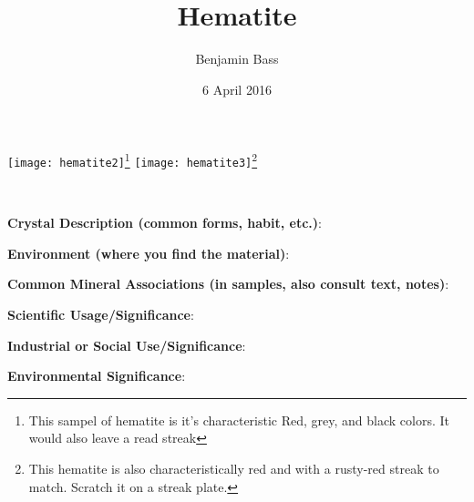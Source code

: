 \documentclass[10pt]{article}
\author{Benjamin Bass}
\date{6 April 2016}
\title{\vspace{-2.0cm}Hematite} %
\begin{document}
\maketitle


\begin{center}
  \texttt{[image: hematite2]}\footnote{This sampel of hematite is it's characteristic Red, grey, and black colors. It would also leave a read streak}
  \texttt{[image: hematite3]}\footnote{This hematite is also characteristically red and with a rusty-red streak to match. Scratch it on a streak plate.}
\end{center}



\
\
\
\
\
\
\
\
\
\

\begin{framed}
  \textbf{Crystal Description (common forms, habit, etc.)}: 
\end{framed}

\begin{framed}
  \textbf{Environment (where you find the material)}: 
\end{framed}

\begin{framed}
  \textbf{Common Mineral Associations (in samples, also consult text, notes)}: 
\end{framed}

\begin{framed}
  \textbf{Scientific Usage/Significance}: 
\end{framed}

\begin{framed}
  \textbf{Industrial or Social Use/Significance}: 
\end{framed}

\begin{framed}
  \textbf{Environmental Significance}: 
\end{framed}

\end{document}
